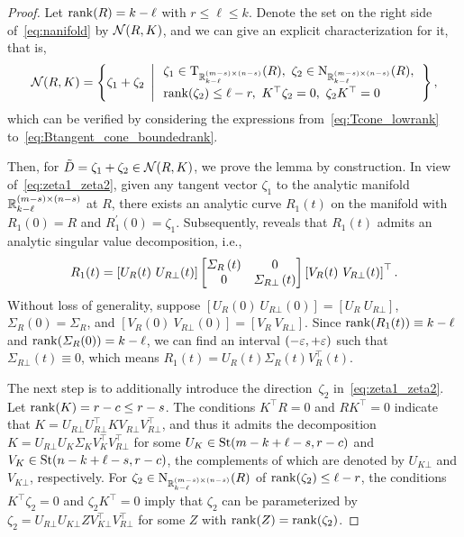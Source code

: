 \begin{proof}
    Let $\operatorname{rank}(R)=k-\ell$ with $r\le \ell\le k$. Denote the set on the right side of~\eqref{eq:nanifold} by $\mathcal{N}(R,K)$, and we can give an explicit characterization for it, that is,
    \begin{equation}\label{eq:zeta1_zeta2}
        \nanifold(R,K) = \hkh{\zeta_1+\zeta_2\ \left|\,\begin{array}{l}\zeta_1\in\Btangent_{\mbR^{(m-s)\times(n-s)}_{k-\ell}}(R),\ \zeta_2\in\normal_{\mbR^{(m-s)\times(n-s)}_{k-\ell}}(R),
        \\[2mm]
         \rank(\zeta_2)\le \ell-r,\ K^\top \zeta_2=0,\ \zeta_2K^\top=0\end{array}\right.},
    \end{equation}
    which can be verified by considering the expressions from~\eqref{eq:Tcone_lowrank} to~\eqref{eq:Btangent_cone_boundedrank}.

    Then, for $\tilde{D}=\zeta_1+\zeta_2\in\mathcal{N}(R,K)$, we prove the lemma by construction. In view of~\eqref{eq:zeta1_zeta2}, given any tangent vector $\zeta_1$ to the analytic manifold $\mathbb{R}^{(m-s)\times(n-s)}_{k-\ell}$ at $R$, there exists an analytic curve $R_1(t)$ on the manifold with $R_1(0)=R$ and $R_1^\prime(0)=\zeta_1$. Subsequently, \cite[Theorem 1]{bunse1991analyticSVD} reveals that $R_1(t)$ admits an analytic singular value decomposition, i.e.,
    \begin{equation}\label{eq:curve_R1}
                R_1(t)=\left[ {U_R(t)\ U_{R\bot}(t)} \right]\left[ \begin{matrix}
    \varSigma _{R}\left( t \right)&		0\\
    0&		\varSigma _{R\bot}\left( t \right)\\
        \end{matrix} \right] \left[ {V_R(t)\ V_{R \bot}(t)} \right]^\top. 
    \end{equation}   
    Without loss of generality, suppose $[U_R(0)\ U_{R\bot}(0)] = [U_R\ U_{R\bot}]$, $\varSigma_R(0)=\varSigma_R$, and $[V_R(0)\ V_{R\bot}(0)]=[V_R\ V_{R\bot}]$. Since $\operatorname{rank}(R_1(t))\equiv k-\ell$ and $\operatorname{rank}(\varSigma_R(0))=k-\ell$, we can find an interval $\left( {-\varepsilon,+\varepsilon} \right)$ such that $\varSigma_{R\bot}(t)\equiv 0$,  which means $R_1(t)=U_R(t)\varSigma_R(t)V^\top_R(t)$. 
    
    The next step is to additionally introduce the direction~$\zeta_2$ in~\eqref{eq:zeta1_zeta2}. Let $\operatorname{rank}(K)=r-c\le r-s$. The conditions $K^\top R=0$ and $RK^\top=0$ indicate that $K=U_{R\bot} U_{R\bot}^\top K V_{R\bot} V_{R\bot}^\top$, and thus it admits the decomposition $K=U_{R\bot}U_K\varSigma_{K}V_K^\top V_{R\bot}^\top$ for some $U_K\in\mathrm{St}(m-k+\ell-s,r-c)$ and $V_K\in\mathrm{St}(n-k+\ell-s,r-c)$, the complements of which are denoted by $U_{K\bot}$ and $V_{K\bot}$, respectively. For $\zeta_2\in\mathrm{N}_{\mathbb{R}^{(m-s)\times(n-s)}_{k-\ell}}(R)$ of $\operatorname{rank}(\zeta_2)\le\ell-r$, the conditions $K^\top \zeta_2=0$ and $\zeta_2K^\top=0$ imply that $\zeta_2$ can be parameterized by $\zeta_2 = U_{R\bot}U_{K\bot}{Z}V_{K\bot}^\top V_{R\bot}^\top$ for some $Z$ with $\operatorname{rank}(Z)=\operatorname{rank}(\zeta_2)$.
    


\end{proof}
